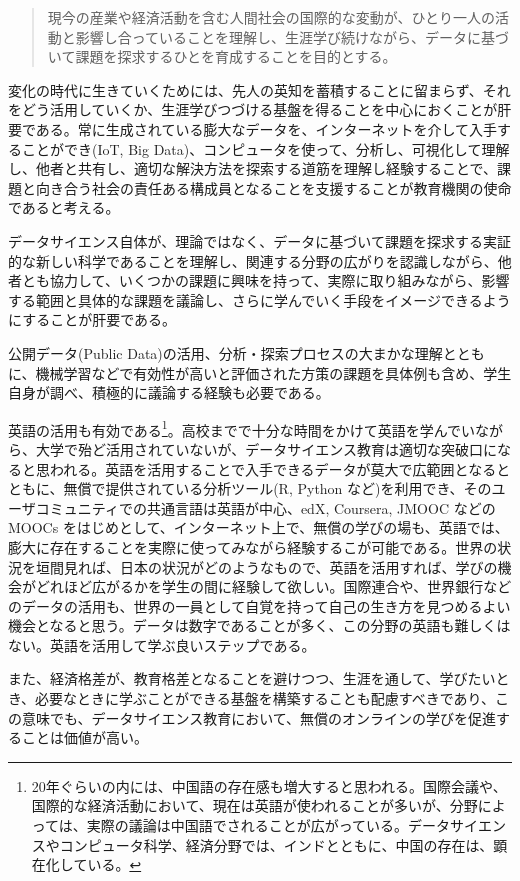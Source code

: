 \documentclass[
]{book}
\theoremstyle{definition}
\theoremstyle{definition}
\theoremstyle{definition}
\theoremstyle{definition}
\theoremstyle{remark}
\begin{document}
\begin{quote}
現今の産業や経済活動を含む人間社会の国際的な変動が、ひとり一人の活動と影響し合っていることを理解し、生涯学び続けながら、データに基づいて課題を探求するひとを育成することを目的とする。
\end{quote}

変化の時代に生きていくためには、先人の英知を蓄積することに留まらず、それをどう活用していくか、生涯学びつづける基盤を得ることを中心におくことが肝要である。常に生成されている膨大なデータを、インターネットを介して入手することができ(IoT, Big Data)、コンピュータを使って、分析し、可視化して理解し、他者と共有し、適切な解決方法を探索する道筋を理解し経験することで、課題と向き合う社会の責任ある構成員となることを支援することが教育機関の使命であると考える。

データサイエンス自体が、理論ではなく、データに基づいて課題を探求する実証的な新しい科学であることを理解し、関連する分野の広がりを認識しながら、他者とも協力して、いくつかの課題に興味を持って、実際に取り組みながら、影響する範囲と具体的な課題を議論し、さらに学んでいく手段をイメージできるようにすることが肝要である。

公開データ(Public Data)の活用、分析・探索プロセスの大まかな理解とともに、機械学習などで有効性が高いと評価された方策の課題を具体例も含め、学生自身が調べ、積極的に議論する経験も必要である。

英語の活用も有効である\footnote{20年ぐらいの内には、中国語の存在感も増大すると思われる。国際会議や、国際的な経済活動において、現在は英語が使われることが多いが、分野によっては、実際の議論は中国語でされることが広がっている。データサイエンスやコンピュータ科学、経済分野では、インドとともに、中国の存在は、顕在化している。}。高校までで十分な時間をかけて英語を学んでいながら、大学で殆ど活用されていないが、データサイエンス教育は適切な突破口になると思われる。英語を活用することで入手できるデータが莫大で広範囲となるとともに、無償で提供されている分析ツール(R, Python など)を利用でき、そのユーザコミュニティでの共通言語は英語が中心、edX, Coursera, JMOOC などの MOOCs をはじめとして、インターネット上で、無償の学びの場も、英語では、膨大に存在することを実際に使ってみながら経験するこが可能である。世界の状況を垣間見れば、日本の状況がどのようなもので、英語を活用すれば、学びの機会がどれほど広がるかを学生の間に経験して欲しい。国際連合や、世界銀行などのデータの活用も、世界の一員として自覚を持って自己の生き方を見つめるよい機会となると思う。データは数字であることが多く、この分野の英語も難しくはない。英語を活用して学ぶ良いステップである。

また、経済格差が、教育格差となることを避けつつ、生涯を通して、学びたいとき、必要なときに学ぶことができる基盤を構築することも配慮すべきであり、この意味でも、データサイエンス教育において、無償のオンラインの学びを促進することは価値が高い。
\end{document}
